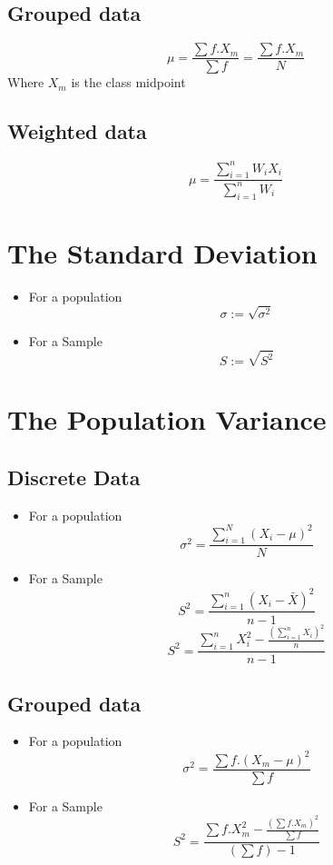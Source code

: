 \documentclass[11pt, a4paper]{article}
\begin{document}
     \subsection{Grouped data}
     $$\mu = \frac{\sum f.X_m}{\sum f}=\frac{\sum f.X_m}{N} $$
     Where $X_m$ is the class midpoint

     \subsection{Weighted data}
     $$\mu = \frac{\sum_{i = 1}^{n} W_iX_i}{\sum_{i = 1}^{n} W_i}$$

     \section{The Standard Deviation}
     \begin{itemize}
        \item For a population
        $$\sigma := \sqrt{\sigma^2}$$
        \item For a Sample
        $$S := \sqrt{S^2}$$
    \end{itemize}

    \section{The Population Variance}
    \subsection{Discrete Data}
    \begin{itemize}
        \item For a population
        $$\sigma^2 = \frac{\sum_{i=1}^N (X_i-\mu)^2}{N}$$
        \item For a Sample
        $$S^2 = \frac{\sum_{i=1}^n (X_i-\bar{X})^2}{n-1}$$
        $$S^2 = \frac{\sum_{i=1}^n X_i^2-\frac{\left(\sum_{i=1}^nX_i\right)^2}{n}}{n-1}$$

    \end{itemize}

    \subsection{Grouped data}
    \begin{itemize}
        \item For a population
        $$\sigma^2 = \frac{\sum f.(X_m-\mu)^2}{\sum f}$$
        \item For a Sample
        $$S^2 = \frac{\sum f.X_m^2-\frac{\left(\sum f.X_m\right)^2}{\sum f}}{\left(\sum f\right)-1}$$

    \end{itemize}
\end{document}
